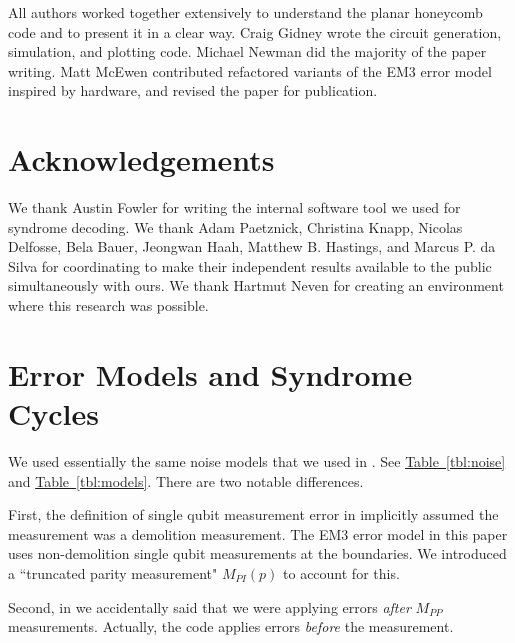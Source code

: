 \documentclass[onecolumn,a4paper,accepted=2022-09-12]{quantumarticle}
\theoremstyle{definition}
\theoremstyle{definition}
\theoremstyle{definition}
\newcommand{\tbl}[1]{\hyperref[tbl:#1]{Table~\ref*{tbl:#1}}}
\begin{document}
All authors worked together extensively to understand the planar honeycomb code and to present it in a clear way.
Craig Gidney wrote the circuit generation, simulation, and plotting code.
Michael Newman did the majority of the paper writing.
Matt McEwen contributed refactored variants of the EM3 error model inspired by hardware, and revised the paper for publication.

\section{Acknowledgements}

We thank Austin Fowler for writing the internal software tool we used for syndrome decoding.
We thank Adam Paetznick, Christina Knapp, Nicolas Delfosse, Bela Bauer, Jeongwan Haah, Matthew B. Hastings, and Marcus P. da Silva for coordinating to make their independent results available to the public simultaneously with ours.
We thank Hartmut Neven for creating an environment where this research was possible.




\appendix
\section{Error Models and Syndrome Cycles}
\label{app:noise}

We used essentially the same noise models that we used in \cite{gidney2021honeycombmemory}.
See \tbl{noise} and \tbl{models}.
There are two notable differences.

First, the definition of single qubit measurement error in \cite{gidney2021honeycombmemory} implicitly assumed the measurement was a demolition measurement.
The EM3 error model in this paper uses non-demolition single qubit measurements at the boundaries.
We introduced a ``truncated parity measurement" $M_{PI}(p)$ to account for this.

Second, in \cite{gidney2021honeycombmemory} we accidentally said that we were applying errors \emph{after} $M_{PP}$ measurements.
Actually, the code applies errors \emph{before} the measurement.
\end{document}
